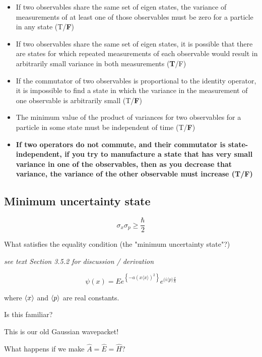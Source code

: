 \documentclass{article}
\begin{document}
\begin{itemize}
    \item If two observables share the same set of eigen states, the variance of measurements of at least one of those observables must be zero for a particle in any state (T/\textbf{F})
    \item If two observables share the same set of eigen states, it is possible that there are states for which repeated measurements of each observable would result in arbitrarily small variance in both measurements (\textbf{T}/F)
    \item If the commutator of two observables is proportional to the identity operator, it is impossible to find a state in which the variance in the measurement of one observable is arbitrarily small (T/\textbf{F}) %
    \item The minimum value of the product of variances for two observables for a particle in some state must be independent of time (T/\textbf{F}) %
    \item \textbf{If two operators do not commute, and their commutator is state-independent, if you try to manufacture a state that has very small variance in one of the observables, then as you decrease that variance, the variance of the other observable must increase (\textbf{T}/F)}

\end{itemize}


\subsection{Minimum uncertainty state}

$$\sigma_x \sigma_p \geq \frac{\hbar}{2}$$

What satisfies the equality condition (the "minimum uncertainty state"?)

\textit{see text Section 3.5.2 for discussion / derivation}

$$\psi(x) = Ee^{\left\{ -a (x \langle x \rangle)^2 \right\}} e^{(i \langle p \rangle \frac{x}{\hbar}}$$

where $\braket{x}$ and $\braket{p}$ are real constants. 

Is this familiar? 

This is our old Gaussian wavepacket!

What happens if we make $\hat{A} = \hat{E} = \hat{H}$?
\end{document}
